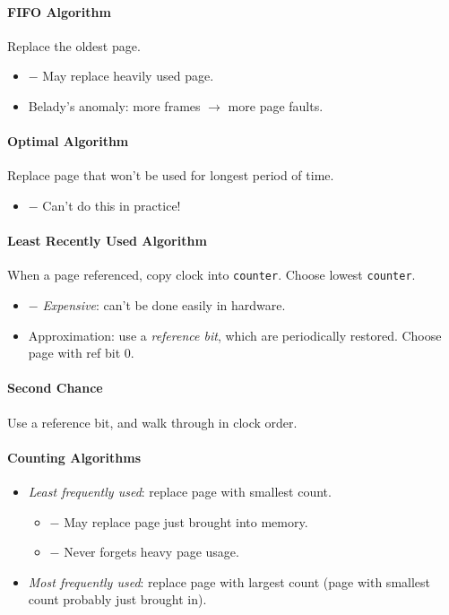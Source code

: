 \documentclass[twocolumn,english]{article}
\begin{document}
\paragraph{FIFO Algorithm}

Replace the oldest page.
\begin{itemize}
\item $-$ May replace heavily used page.
\item Belady's anomaly: more frames $\rightarrow$ more page faults.
\end{itemize}

\paragraph{Optimal Algorithm}

Replace page that won't be used for longest period of time.
\begin{itemize}
\item $-$ Can't do this in practice!
\end{itemize}

\paragraph{Least Recently Used Algorithm}

When a page referenced, copy clock into \texttt{counter}. Choose lowest
\texttt{counter}.
\begin{itemize}
\item $-$ \emph{Expensive}: can't be done easily in hardware.
\item Approximation: use a \emph{reference bit}, which are periodically
restored. Choose page with ref bit 0.
\end{itemize}

\paragraph{Second Chance}

Use a reference bit, and walk through in clock order.

\paragraph{Counting Algorithms}
\begin{itemize}
\item \emph{Least frequently used}: replace page with smallest count.
\begin{itemize}
\item $-$ May replace page just brought into memory.
\item $-$ Never forgets heavy page usage.
\end{itemize}
\item \emph{Most frequently used}: replace page with largest count (page
with smallest count probably just brought in).
\end{itemize}
\end{document}
